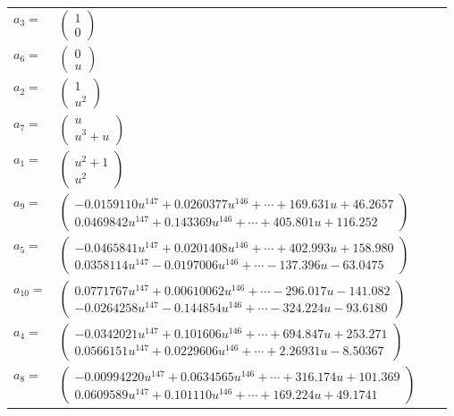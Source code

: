 \documentclass[1p]{elsarticle_modified}
\theoremstyle{definition}
\begin{document}
\begin{tabular}{m{7pt} m{180pt} m{7pt} m{180pt} }
\flushright $a_{3}=$&$\begin{pmatrix}1\\0\end{pmatrix}$ \\
\flushright $a_{6}=$&$\begin{pmatrix}0\\u\end{pmatrix}$ \\
\flushright $a_{2}=$&$\begin{pmatrix}1\\u^2\end{pmatrix}$ \\
\flushright $a_{7}=$&$\begin{pmatrix}u\\u^3+u\end{pmatrix}$ \\
\flushright $a_{1}=$&$\begin{pmatrix}u^2+1\\u^2\end{pmatrix}$ \\
\flushright $a_{9}=$&$\begin{pmatrix}-0.0159110 u^{147}+0.0260377 u^{146}+\cdots+169.631 u+46.2657\\0.0469842 u^{147}+0.143369 u^{146}+\cdots+405.801 u+116.252\end{pmatrix}$ \\
\flushright $a_{5}=$&$\begin{pmatrix}-0.0465841 u^{147}+0.0201408 u^{146}+\cdots+402.993 u+158.980\\0.0358114 u^{147}-0.0197006 u^{146}+\cdots-137.396 u-63.0475\end{pmatrix}$ \\
\flushright $a_{10}=$&$\begin{pmatrix}0.0771767 u^{147}+0.00610062 u^{146}+\cdots-296.017 u-141.082\\-0.0264258 u^{147}-0.144854 u^{146}+\cdots-324.224 u-93.6180\end{pmatrix}$ \\
\flushright $a_{4}=$&$\begin{pmatrix}-0.0342021 u^{147}+0.101606 u^{146}+\cdots+694.847 u+253.271\\0.0566151 u^{147}+0.0229606 u^{146}+\cdots+2.26931 u-8.50367\end{pmatrix}$ \\
\flushright $a_{8}=$&$\begin{pmatrix}-0.00994220 u^{147}+0.0634565 u^{146}+\cdots+316.174 u+101.369\\0.0609589 u^{147}+0.101110 u^{146}+\cdots+169.224 u+49.1741\end{pmatrix}$ \\

\end{tabular}
\end{document}
